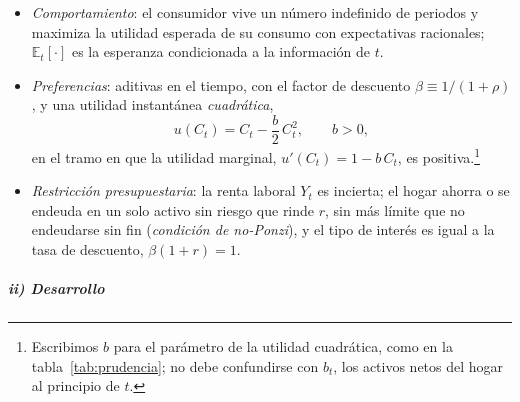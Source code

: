 \documentclass[11pt]{article}
\begin{document}
\begin{itemize}
\item \emph{Comportamiento}: el consumidor vive un número indefinido de periodos y maximiza la utilidad esperada de su consumo con expectativas racionales; $\mathbb{E}_t[\cdot]$ es la esperanza condicionada a la información de $t$.
\item \emph{Preferencias}: aditivas en el tiempo, con el factor de descuento $\beta\equiv 1/(1+\rho)$, y una utilidad instantánea \emph{cuadrática},
  \begin{equation*}
  u(C_t)=C_t-\frac{b}{2}\,C_t^2,\qquad b>0,
  \end{equation*}
  en el tramo en que la utilidad marginal, $u'(C_t)=1-b\,C_t$, es positiva.\footnote{Escribimos $b$ para el parámetro de la utilidad cuadrática, como en la tabla~\ref{tab:prudencia}; no debe confundirse con $b_t$, los activos netos del hogar al principio de $t$.}
\item \emph{Restricción presupuestaria}: la renta laboral $Y_t$ es incierta; el hogar ahorra o se endeuda en un solo activo sin riesgo que rinde $r$, sin más límite que no endeudarse sin fin (\emph{condición de no-Ponzi}), y el tipo de interés es igual a la tasa de descuento, $\beta(1+r)=1$.
\end{itemize}

\subparagraph{ii) Desarrollo}
\end{document}

